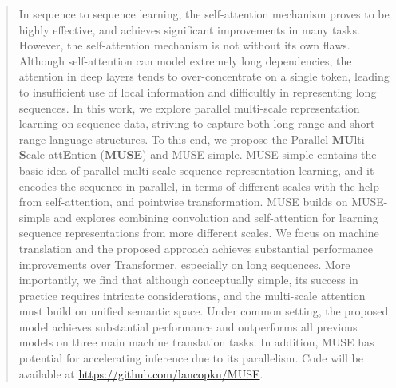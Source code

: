 \documentclass{article} %
\begin{document}
\begin{abstract}
In sequence to sequence learning, the self-attention mechanism proves to be highly effective, and achieves significant improvements in many tasks. However, the self-attention mechanism is not without its own flaws. Although self-attention can model extremely long dependencies, the attention in deep layers tends to over-concentrate on a single token, leading to insufficient use of local information and difficultly in representing long sequences. In this work, we explore parallel multi-scale representation learning on sequence data, striving to capture both long-range and short-range language structures. To this end, we propose the Parallel \textbf{ MU}lti-\textbf{S}cale att\textbf{E}ntion (\textbf{MUSE}) and MUSE-simple. MUSE-simple contains the basic idea of parallel multi-scale sequence representation learning, and it encodes the sequence in parallel, in terms of different scales with the help from self-attention,  and pointwise transformation. MUSE builds on MUSE-simple and explores  combining convolution and self-attention for learning sequence representations from more different scales.
We focus on machine translation and the proposed approach achieves substantial performance improvements over Transformer, especially on long sequences. More importantly, we find that although conceptually simple, its success in practice requires intricate considerations, and the multi-scale attention must build on unified semantic space. Under common setting, the proposed model achieves substantial performance and outperforms all previous models on three main machine translation tasks. In addition, MUSE has potential for accelerating inference due to its parallelism.
Code will be available at \url{https://github.com/lancopku/MUSE}.






\end{abstract}
\end{document}
